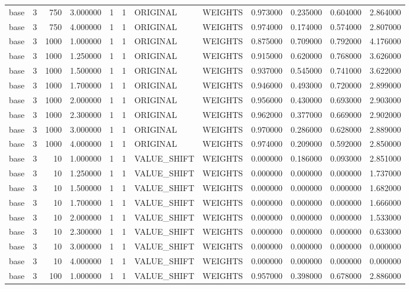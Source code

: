 \begin{tabular}{lrrrllllrrrr}
base & 3 & 750 & 3.000000 & 1 & 1 & ORIGINAL & WEIGHTS & 0.973000 & 0.235000 & 0.604000 & 2.864000 \\
base & 3 & 750 & 4.000000 & 1 & 1 & ORIGINAL & WEIGHTS & 0.974000 & 0.174000 & 0.574000 & 2.807000 \\
base & 3 & 1000 & 1.000000 & 1 & 1 & ORIGINAL & WEIGHTS & 0.875000 & 0.709000 & 0.792000 & 4.176000 \\
base & 3 & 1000 & 1.250000 & 1 & 1 & ORIGINAL & WEIGHTS & 0.915000 & 0.620000 & 0.768000 & 3.626000 \\
base & 3 & 1000 & 1.500000 & 1 & 1 & ORIGINAL & WEIGHTS & 0.937000 & 0.545000 & 0.741000 & 3.622000 \\
base & 3 & 1000 & 1.700000 & 1 & 1 & ORIGINAL & WEIGHTS & 0.946000 & 0.493000 & 0.720000 & 2.899000 \\
base & 3 & 1000 & 2.000000 & 1 & 1 & ORIGINAL & WEIGHTS & 0.956000 & 0.430000 & 0.693000 & 2.903000 \\
base & 3 & 1000 & 2.300000 & 1 & 1 & ORIGINAL & WEIGHTS & 0.962000 & 0.377000 & 0.669000 & 2.902000 \\
base & 3 & 1000 & 3.000000 & 1 & 1 & ORIGINAL & WEIGHTS & 0.970000 & 0.286000 & 0.628000 & 2.889000 \\
base & 3 & 1000 & 4.000000 & 1 & 1 & ORIGINAL & WEIGHTS & 0.974000 & 0.209000 & 0.592000 & 2.850000 \\
base & 3 & 10 & 1.000000 & 1 & 1 & VALUE_SHIFT & WEIGHTS & 0.000000 & 0.186000 & 0.093000 & 2.851000 \\
base & 3 & 10 & 1.250000 & 1 & 1 & VALUE_SHIFT & WEIGHTS & 0.000000 & 0.000000 & 0.000000 & 1.737000 \\
base & 3 & 10 & 1.500000 & 1 & 1 & VALUE_SHIFT & WEIGHTS & 0.000000 & 0.000000 & 0.000000 & 1.682000 \\
base & 3 & 10 & 1.700000 & 1 & 1 & VALUE_SHIFT & WEIGHTS & 0.000000 & 0.000000 & 0.000000 & 1.666000 \\
base & 3 & 10 & 2.000000 & 1 & 1 & VALUE_SHIFT & WEIGHTS & 0.000000 & 0.000000 & 0.000000 & 1.533000 \\
base & 3 & 10 & 2.300000 & 1 & 1 & VALUE_SHIFT & WEIGHTS & 0.000000 & 0.000000 & 0.000000 & 0.633000 \\
base & 3 & 10 & 3.000000 & 1 & 1 & VALUE_SHIFT & WEIGHTS & 0.000000 & 0.000000 & 0.000000 & 0.000000 \\
base & 3 & 10 & 4.000000 & 1 & 1 & VALUE_SHIFT & WEIGHTS & 0.000000 & 0.000000 & 0.000000 & 0.000000 \\
base & 3 & 100 & 1.000000 & 1 & 1 & VALUE_SHIFT & WEIGHTS & 0.957000 & 0.398000 & 0.678000 & 2.886000 \\

\end{tabular}
